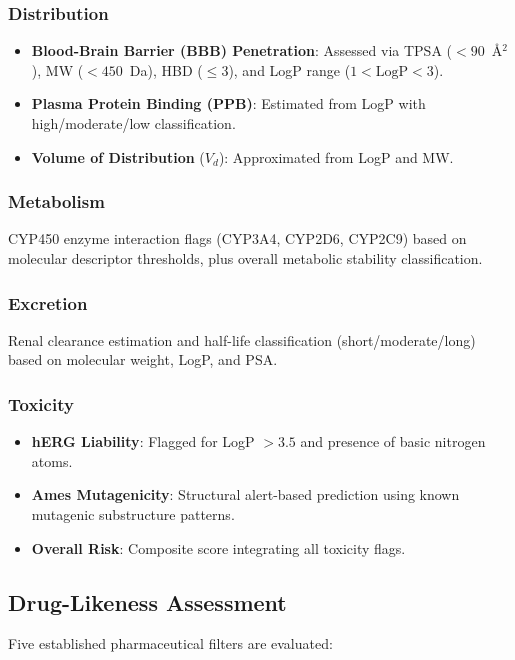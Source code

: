 \documentclass[conference]{IEEEtran}
\begin{document}
\subsubsection{Distribution}
\begin{itemize}
    \item \textbf{Blood-Brain Barrier (BBB) Penetration}: Assessed via TPSA ($< 90$~\AA$^2$), MW ($< 450$~Da), HBD ($\leq 3$), and LogP range ($1 < \text{LogP} < 3$).
    \item \textbf{Plasma Protein Binding (PPB)}: Estimated from LogP with high/moderate/low classification.
    \item \textbf{Volume of Distribution} ($V_d$): Approximated from LogP and MW.
\end{itemize}

\subsubsection{Metabolism}
CYP450 enzyme interaction flags (CYP3A4, CYP2D6, CYP2C9) based on molecular descriptor thresholds, plus overall metabolic stability classification.

\subsubsection{Excretion}
Renal clearance estimation and half-life classification (short/moderate/long) based on molecular weight, LogP, and PSA.

\subsubsection{Toxicity}
\begin{itemize}
    \item \textbf{hERG Liability}: Flagged for LogP $> 3.5$ and presence of basic nitrogen atoms.
    \item \textbf{Ames Mutagenicity}: Structural alert-based prediction using known mutagenic substructure patterns.
    \item \textbf{Overall Risk}: Composite score integrating all toxicity flags.
\end{itemize}

\subsection{Drug-Likeness Assessment}

Five established pharmaceutical filters are evaluated:
\end{document}
